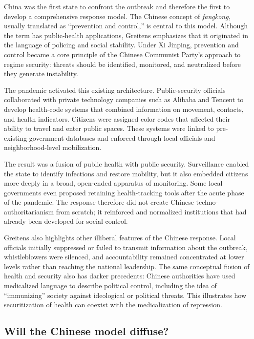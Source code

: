 China was the first state to confront the outbreak and therefore the first to develop a comprehensive response model. The Chinese concept of \textit{fangkong}, usually translated as ``prevention and control,'' is central to this model. Although the term has public-health applications, Greitens emphasizes that it originated in the language of policing and social stability. Under Xi Jinping, prevention and control became a core principle of the Chinese Communist Party's approach to regime security: threats should be identified, monitored, and neutralized before they generate instability.

The pandemic activated this existing architecture. Public-security officials collaborated with private technology companies such as Alibaba and Tencent to develop health-code systems that combined information on movement, contacts, and health indicators. Citizens were assigned color codes that affected their ability to travel and enter public spaces. These systems were linked to pre-existing government databases and enforced through local officials and neighborhood-level mobilization.

The result was a fusion of public health with public security. Surveillance enabled the state to identify infections and restore mobility, but it also embedded citizens more deeply in a broad, open-ended apparatus of monitoring. Some local governments even proposed retaining health-tracking tools after the acute phase of the pandemic. The response therefore did not create Chinese techno-authoritarianism from scratch; it reinforced and normalized institutions that had already been developed for social control.

Greitens also highlights other illiberal features of the Chinese response. Local officials initially suppressed or failed to transmit information about the outbreak, whistleblowers were silenced, and accountability remained concentrated at lower levels rather than reaching the national leadership. The same conceptual fusion of health and security also has darker precedents: Chinese authorities have used medicalized language to describe political control, including the idea of ``immunizing'' society against ideological or political threats. This illustrates how securitization of health can coexist with the medicalization of repression.

\subsection{Will the Chinese model diffuse?}

